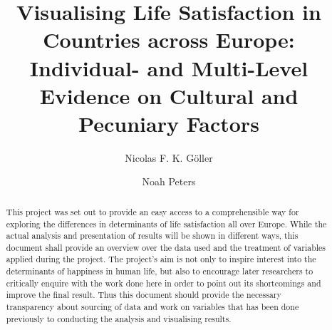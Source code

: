 \documentclass[preprint,12pt,authoryear]{elsarticle}
\begin{document}
	
	\begin{frontmatter}
		
		
		
		\title{Visualising Life Satisfaction in Countries across Europe: Individual- and Multi-Level Evidence on Cultural and Pecuniary Factors}
		
		\author{Nicolas F. K. Göller}
		
		\author{Noah Peters}
		
		\address{Zeppelin University, Fallenbrunnen 3, 88045 Friedrichshafen}
		
		
		\begin{abstract}
			This project was set out to provide an easy access to a comprehensible way for exploring the differences in determinants of life satisfaction 
			all over Europe. While the actual analysis and presentation of results will be shown in different ways, this document
			shall provide an overview over the data used and the treatment of variables applied during the project. 
			The project's aim is not only to inspire interest into the determinants of happiness in human life, but also to encourage
			later researchers to critically enquire with the work done here in order to point out its shortcomings and improve the final
			result. Thus this document should provide the necessary transparency about sourcing of data and work on variables that
			has been done previously to conducting the analysis and visualising results.
		\end{abstract}
		
	\end{frontmatter}
	
\end{document}
